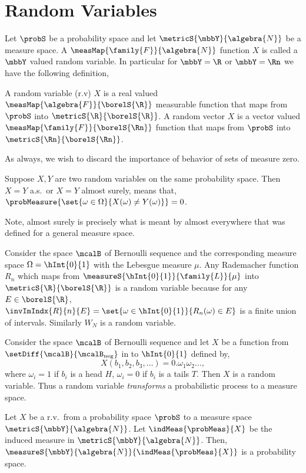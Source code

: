 \chapter{Random Variables}
Let $\probS$ be a probability space and let $\metricS{\mbbY}{\algebra{N}}$ be a measure space. A
$\measMap{\family{F}}{\algebra{N}}$ function $X$ is called a $\mbbY$ valued random variable.
In particular for $\mbbY = \R$ or $\mbbY = \Rn$ we have the following definition,
\begin{Definition}[name=Random variable]
    A random variable (r.v) $X$ is a real valued 
    $\measMap{\algebra{F}}{\borelS{\R}}$ measurable function that maps from $\probS$ into
    $\metricS{\R}{\borelS{\R}}$. A random vector $X$ is a vector valued $\measMap{\family{F}}{\borelS{\Rn}}$
    function that maps from $\probS$ into $\metricS{\Rn}{\borelS{\Rn}}$.
\end{Definition}
As always, we wish to discard the importance of behavior of sets of measure zero.
\begin{Definition}[name=Almost surely]
    Suppose $X,Y$ are two random variables on the same probability space. Then $X = Y$ a.s.~or $X = Y$ almost
    surely, means that,
    $\probMeasure{\set{\omega\in\Omega}{X(\omega) \neq Y(\omega)} }= 0$.
\end{Definition}
Note, almost surely is precisely what is meant by almost everywhere that was defined for a general measure
space.
\begin{Example}
    Consider the space $\mcalB$ of Bernoulli sequence and the corresponding measure space $\Omega = \hInt{0}{1}$
    with the Lebesgue measure $\mu$. Any Rademacher function $R_n$ which maps from
    $\measureS{\hInt{0}{1}}{\family{L}}{\mu}$ into $\metricS{\R}{\borelS{\R}}$ 
    is a random variable because for any $E\in\borelS{\R}$, 
    $\invImIndx{R}{n}{E} = \set{\omega\in\hInt{0}{1}}{R_n(\omega)\in E}$ is a finite union of
    intervals. Similarly $W_N$ is a random variable.
\end{Example}
\begin{Example}
    Consider the space $\mcalB$ of Bernoulli sequence and let $X$ be a function from
    $\setDiff{\mcalB}{\mcalB_{\text{neg}}}$ in to $\hInt{0}{1}$ defined by,
    \[X(b_1,b_2,b_3,\dots) = 0.\omega_1\omega_2\dots,\]
    where $\omega_i = 1$ if $b_i$ is a head $H$, $\omega_i = 0$ if $b_i$ is a tails $T$. Then $X$ is a random
    variable. Thus a random variable \emph{transforms} a probabilistic process to a measure space.
\end{Example}
\begin{Proposition}
    Let $X$ be a r.v.~from a probability space $\probS$ to a measure space $\metricS{\mbbY}{\algebra{N}}$.
    Let $\indMeas{\probMeas}{X}$ be the induced measure in $\metricS{\mbbY}{\algebra{N}}$. Then, 
    $\measureS{\mbbY}{\algebra{N}}{\indMeas{\probMeas}{X}}$ is a probability space.  
\end{Proposition}
